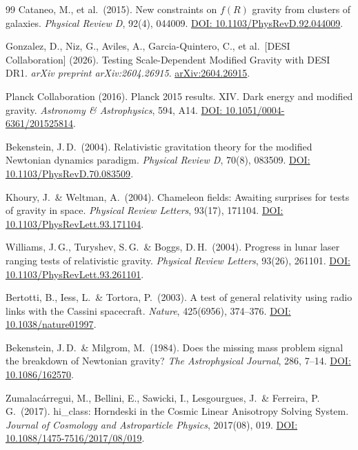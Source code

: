 \documentclass[aps,prd,twocolumn,superscriptaddress,nofootinbib]{revtex4-2}
\begin{document}
\begin{thebibliography}{99}
Cataneo, M., et al.\ (2015).
New constraints on $f(R)$ gravity from clusters of galaxies.
\textit{Physical Review D}, 92(4), 044009.
\href{https://doi.org/10.1103/PhysRevD.92.044009}{DOI: 10.1103/PhysRevD.92.044009}.

Gonzalez, D., Niz, G., Aviles, A., Garcia-Quintero, C., et al.\ [DESI Collaboration] (2026).
Testing Scale-Dependent Modified Gravity with DESI DR1.
\textit{arXiv preprint arXiv:2604.26915}.
\href{https://arxiv.org/abs/2604.26915}{arXiv:2604.26915}.

Planck Collaboration (2016).
Planck 2015 results. XIV. Dark energy and modified gravity.
\textit{Astronomy \& Astrophysics}, 594, A14.
\href{https://doi.org/10.1051/0004-6361/201525814}{DOI: 10.1051/0004-6361/201525814}.

Bekenstein, J.\,D.\ (2004).
Relativistic gravitation theory for the modified Newtonian dynamics paradigm.
\textit{Physical Review D}, 70(8), 083509.
\href{https://doi.org/10.1103/PhysRevD.70.083509}{DOI: 10.1103/PhysRevD.70.083509}.

Khoury, J.\ \& Weltman, A.\ (2004).
Chameleon fields: Awaiting surprises for tests of gravity in space.
\textit{Physical Review Letters}, 93(17), 171104.
\href{https://doi.org/10.1103/PhysRevLett.93.171104}{DOI: 10.1103/PhysRevLett.93.171104}.

Williams, J.\,G., Turyshev, S.\,G.\ \& Boggs, D.\,H.\ (2004).
Progress in lunar laser ranging tests of relativistic gravity.
\textit{Physical Review Letters}, 93(26), 261101.
\href{https://doi.org/10.1103/PhysRevLett.93.261101}{DOI: 10.1103/PhysRevLett.93.261101}.

Bertotti, B., Iess, L.\ \& Tortora, P.\ (2003).
A test of general relativity using radio links with the Cassini spacecraft.
\textit{Nature}, 425(6956), 374--376.
\href{https://doi.org/10.1038/nature01997}{DOI: 10.1038/nature01997}.

Bekenstein, J.\,D.\ \& Milgrom, M.\ (1984).
Does the missing mass problem signal the breakdown of Newtonian gravity?
\textit{The Astrophysical Journal}, 286, 7--14.
\href{https://doi.org/10.1086/162570}{DOI: 10.1086/162570}.

Zumalac\'arregui, M., Bellini, E., Sawicki, I., Lesgourgues, J.\ \& Ferreira, P.\,G.\ (2017).
hi\_class: Horndeski in the Cosmic Linear Anisotropy Solving System.
\textit{Journal of Cosmology and Astroparticle Physics}, 2017(08), 019.
\href{https://doi.org/10.1088/1475-7516/2017/08/019}{DOI: 10.1088/1475-7516/2017/08/019}.


\end{thebibliography}
\end{document}
